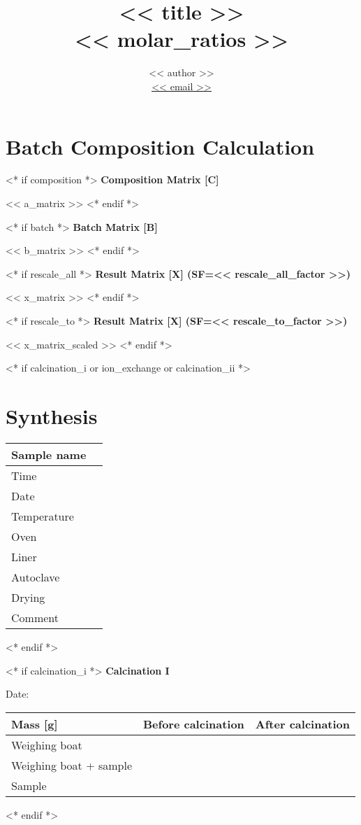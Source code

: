 \documentclass[10pt,a4paper]{article}
\title{<< title >> \\ {\large \normalfont << molar_ratios >>}}
\author{ << author >> \\ \href{mailto: << email >>}{\underline{<< email >>}}\\}
\newcommand{\subsecwithdate}[1]{{\bfseries\large {#1}} \hfill %
{Date: \begin{minipage}{1.2in} \hfill\vspace{10pt} \end{minipage} } \par}
\newcommand{\subsecwodate}[1]{{\bfseries\large {#1}} \par }
\begin{document}
\maketitle

\section{Batch Composition Calculation}
<* if composition *>
\subsecwodate{Composition Matrix [C]}
<< a_matrix >>
<* endif *>

<* if batch *>
\subsecwodate{Batch Matrix [B]}
<< b_matrix >>
<* endif *>

<* if rescale_all *>
\subsecwodate{Result Matrix [X] (SF=<< rescale_all_factor >>)}
<< x_matrix >>
<* endif *>

<* if rescale_to *>
\subsecwodate{Result Matrix [X] (SF=<< rescale_to_factor >>)}
<< x_matrix_scaled >>
<* endif *>

<* if calcination_i or ion_exchange or calcination_ii *>
\newpage
\section{Synthesis}
\begin{center}
\begin{tabularx}{\textwidth}{l|C}
\toprule
Sample name & \\
\midrule
Time & \\ 
Date & \\ 
Temperature & \\ 
Oven & \\ 
Liner & \\ 
Autoclave & \\ 
Drying & \\ 
Comment & \\
\bottomrule
\end{tabularx}
\end{center}
<* endif *>

<* if calcination_i *>
\subsecwithdate{Calcination I}
\begin{center}
\begin{tabularx}{\textwidth}{l|C|C}
\toprule
Mass [g] & Before calcination & After calcination \\
\midrule
Weighing boat & & \\ 
Weighing boat + sample & & \\ 
Sample & & \\
\bottomrule
\end{tabularx}
\end{center}
<* endif *>
\end{document}
